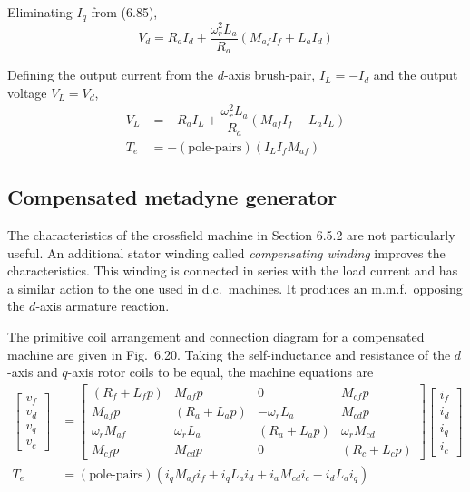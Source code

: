 \documentclass[a4paper,numbers=noenddot,12pt]{scrbook}
\begin{document}
    Eliminating $I_q$ from (6.85),
    \begin{equation}
        V_d = R_a I_d + \dfrac{\omega_r^2 L_a}{R_a}(M_{af} I_f + L_a I_d)
        \label{eq:Eq6.87}
    \end{equation}

    Defining the output current from the $d$-axis brush-pair, $I_L = -I_d$ and the output voltage $V_L = V_d$,
    \begin{align}
        V_L & = -R_a I_L + \dfrac{\omega_r^2 L_a}{R_a}(M_{af} I_f - L_a I_L) \\
        T_e & = -(\text{pole-pairs})(I_L I_f M_{af})
        \label{eq:Eq6.89}
    \end{align}

    \subsection{Compensated metadyne generator}
    The characteristics of the crossfield machine in Section 6.5.2 are not particularly useful. An additional stator winding called \textit{compensating winding} improves the characteristics. This winding is connected in series with the load current and has a similar action to the one used in d.c.\ machines. It produces an m.m.f.\ opposing the $d$-axis armature reaction.

    The primitive coil arrangement and connection diagram for a compensated machine are given in Fig.\ 6.20. Taking the self-inductance and resistance of the $d$-axis and $q$-axis rotor coils to be equal, the machine equations are
    \begin{align}
        \begin{bmatrix}
            v_f \\ v_d \\ v_q \\ v_c
        \end{bmatrix}
        & = 
        \begin{bmatrix}
            (R_f + L_f p) & M_{af} p & 0 & M_{cf} p \\
            M_{af} p & (R_a + L_a p) & -\omega_r L_a & M_{cd} p \\
            \omega_r M_{af} & \omega_r L_a & (R_a + L_a p) & \omega_r M_{cd} \\
            M_{cf} p & M_{cd} p & 0 & (R_c + L_c p)
        \end{bmatrix}
        \begin{bmatrix}
            i_f \\ i_d \\ i_q \\ i_c
        \end{bmatrix} \\
        T_e & = (\text{pole-pairs})(i_q M_{af} i_f + i_q L_a i_d + i_a M_{cd} i_c - i_d L_a i_q)
        \label{eq:Eq6.91}
    \end{align}
\end{document}

